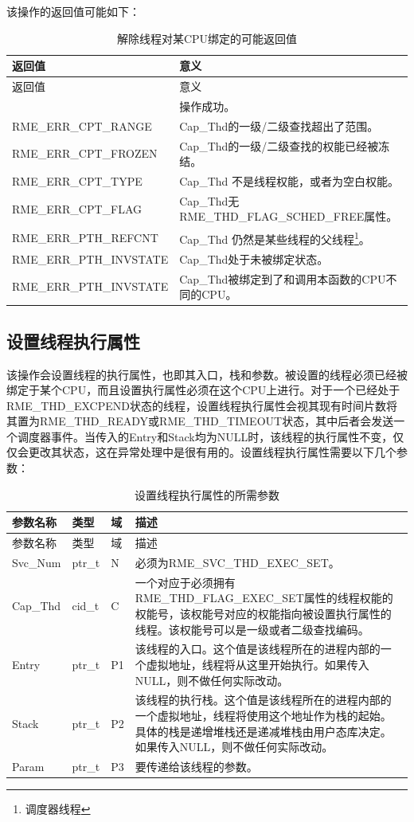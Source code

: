 该操作的返回值可能如下：

\begin{xltabular}{\textwidth}{@{}>{\hsize\raggedright\arraybackslash}X>{\hsize\raggedright\arraybackslash}X@{}}
\caption{解除线程对某CPU绑定的可能返回值}\label{tab:4-27-unbind-thread-from-cpu-return-values}\\
\toprule
返回值 & 意义\tabularnewline
\endfirsthead
\toprule
返回值 & 意义\tabularnewline
\midrule
\endhead
\bottomrule
{} & 操作成功。\tabularnewline
    RME\_ERR\_CPT\_RANGE & Cap\_Thd的一级/二级查找超出了范围。\tabularnewline
    RME\_ERR\_CPT\_FROZEN & Cap\_Thd的一级/二级查找的权能已经被冻结。\tabularnewline
    RME\_ERR\_CPT\_TYPE & Cap\_Thd 不是线程权能，或者为空白权能。\tabularnewline
    RME\_ERR\_CPT\_FLAG & Cap\_Thd无RME\_THD\_FLAG\_SCHED\_FREE属性。\tabularnewline
    RME\_ERR\_PTH\_REFCNT & Cap\_Thd 仍然是某些线程的父线程\footnote{调度器线程}。\tabularnewline
    RME\_ERR\_PTH\_INVSTATE & Cap\_Thd处于未被绑定状态。\tabularnewline
    RME\_ERR\_PTH\_INVSTATE & Cap\_Thd被绑定到了和调用本函数的CPU不同的CPU。\tabularnewline
\end{xltabular}

\subsection{设置线程执行属性}\label{subsec:4-set-thread-execution-attributes}

该操作会设置线程的执行属性，也即其入口，栈和参数。被设置的线程必须已经被绑定于某个CPU，而且设置执行属性必须在这个CPU上进行。对于一个已经处于RME\_THD\_EXCPEND状态的线程，设置线程执行属性会视其现有时间片数将其置为RME\_THD\_READY或RME\_THD\_TIMEOUT状态，其中后者会发送一个调度器事件。当传入的Entry和Stack均为NULL时，该线程的执行属性不变，仅仅会更改其状态，这在异常处理中是很有用的。设置线程执行属性需要以下几个参数：

\begin{xltabular}{\textwidth}{@{}>{\hsize\raggedright\arraybackslash}X>{\hsize\raggedright\arraybackslash}X>{\hsize\raggedright\arraybackslash}X>{\hsize\raggedright\arraybackslash}X@{}}
\caption{设置线程执行属性的所需参数}\label{tab:4-28-set-thread-execution-attributes-parameters}\\
\toprule
参数名称 & 类型 & 域 & 描述\tabularnewline
\endfirsthead
\toprule
参数名称 & 类型 & 域 & 描述\tabularnewline
\midrule
\endhead
\bottomrule
\endlastfoot
Svc\_Num & ptr\_t & N & 必须为RME\_SVC\_THD\_EXEC\_SET。\tabularnewline
Cap\_Thd & cid\_t & C &
一个对应于必须拥有RME\_THD\_FLAG\_EXEC\_SET属性的线程权能的权能号，该权能号对应的权能指向被设置执行属性的线程。该权能号可以是一级或者二级查找编码。\tabularnewline
Entry & ptr\_t & P1 &
该线程的入口。这个值是该线程所在的进程内部的一个虚拟地址，线程将从这里开始执行。如果传入NULL，则不做任何实际改动。\tabularnewline
Stack & ptr\_t & P2 &
该线程的执行栈。这个值是该线程所在的进程内部的一个虚拟地址，线程将使用这个地址作为栈的起始。具体的栈是递增堆栈还是递减堆栈由用户态库决定。如果传入NULL，则不做任何实际改动。\tabularnewline
Param & ptr\_t & P3 & 要传递给该线程的参数。\tabularnewline
\end{xltabular}


